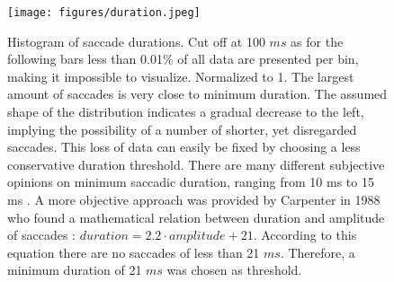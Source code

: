 \documentclass[10pt,a4paper,twocolumn]{article}
\begin{document}
\begin{table}[h]

\centering
{}
\caption{Movie segment analysis showing mean values for different metrics over every test subject in a run: Mean value of signal loss in seconds per minute , $r^2$ values for the correlation between peak velocity and amplitude, average percentage of samples removed, average slope of the main sequence. Due to blinks and noise, some samples were removed from the eye gaze data before calculations started. The average percentage of removed samples is illustrated. Across all participants 16\% was the maximum amount of samples neglected and in 93.3\% of the data less than 10\% were disregarded. Included in this removal was the actual pure signal loss during the recording session, meaning samples marked with a null value.}
\label{rundetails2}
\end{table}

\begin{figure}[h]
\centering
\texttt{[image: figures/duration.jpeg]}
        \caption{Histogram of saccade durations. Cut off at 100 $ms$ as for the following bars less than 0.01\% of all data are presented per bin, making it impossible to visualize. Normalized to 1. The largest amount of saccades is very close to minimum duration. The assumed shape of the distribution indicates a gradual decrease to the left, implying the possibility of a number of shorter, yet disregarded saccades. This loss of data can easily be fixed by choosing a less conservative duration threshold. There are many different subjective opinions on minimum saccadic duration, ranging from 10 ms \cite{Duchowski.2007} to 15 ms \cite{Smith.2013}. A more objective approach was provided by Carpenter in 1988 who found a mathematical relation between duration and amplitude of saccades \cite{Carpenter.1988}: $duration=2.2\cdot{}amplitude+21$. According to this equation there are no saccades of less than 21 $ms$. Therefore, a minimum duration of 21 $ms$ was chosen as threshold.}
\label{dur}
\end{figure}
\end{document}
